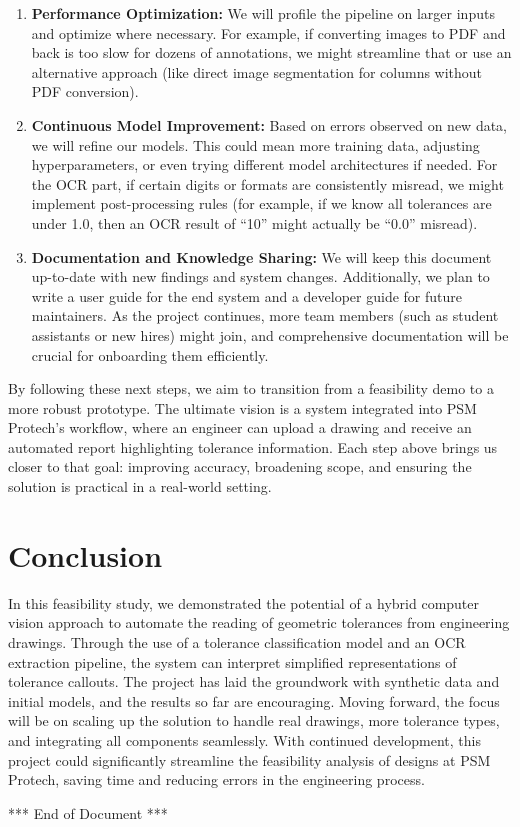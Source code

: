 \documentclass[11pt,a4paper]{article}
\begin{document}
\begin{enumerate}
  \item \textbf{Performance Optimization:} We will profile the pipeline on larger inputs and optimize where necessary. For example, if converting images to PDF and back is too slow for dozens of annotations, we might streamline that or use an alternative approach (like direct image segmentation for columns without PDF conversion).
  \item \textbf{Continuous Model Improvement:} Based on errors observed on new data, we will refine our models. This could mean more training data, adjusting hyperparameters, or even trying different model architectures if needed. For the OCR part, if certain digits or formats are consistently misread, we might implement post-processing rules (for example, if we know all tolerances are under 1.0, then an OCR result of “10” might actually be “0.0” misread).
  \item \textbf{Documentation and Knowledge Sharing:} We will keep this document up-to-date with new findings and system changes. Additionally, we plan to write a user guide for the end system and a developer guide for future maintainers. As the project continues, more team members (such as student assistants or new hires) might join, and comprehensive documentation will be crucial for onboarding them efficiently.
\end{enumerate}

By following these next steps, we aim to transition from a feasibility demo to a more robust prototype. The ultimate vision is a system integrated into PSM Protech’s workflow, where an engineer can upload a drawing and receive an automated report highlighting tolerance information. Each step above brings us closer to that goal: improving accuracy, broadening scope, and ensuring the solution is practical in a real-world setting.

\section*{Conclusion}
In this feasibility study, we demonstrated the potential of a hybrid computer vision approach to automate the reading of geometric tolerances from engineering drawings. Through the use of a tolerance classification model and an OCR extraction pipeline, the system can interpret simplified representations of tolerance callouts. The project has laid the groundwork with synthetic data and initial models, and the results so far are encouraging. Moving forward, the focus will be on scaling up the solution to handle real drawings, more tolerance types, and integrating all components seamlessly. With continued development, this project could significantly streamline the feasibility analysis of designs at PSM Protech, saving time and reducing errors in the engineering process.

\vfill
\begin{center}
*** End of Document ***
\end{center}
\end{document}
